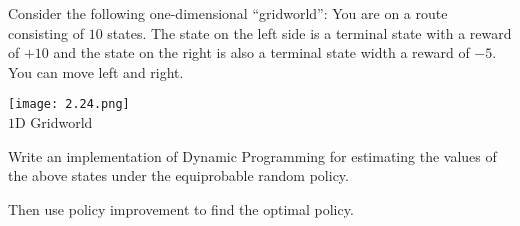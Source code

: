 
\begin{exercise}

Consider the following one-dimensional \enquote{gridworld}:
You are on a route consisting of $10$ states.
The state on the left side is a terminal state with a reward of $+10$ and the state on the right is also a terminal state width a reward of $-5$.
You can move left and right.

\begin{center}
    \texttt{[image: 2.24.png]} \\
    $1$D Gridworld
\end{center}

Write an implementation of Dynamic Programming for estimating the values of the above states under the equiprobable random policy.

Then use policy improvement to find the optimal policy.

\end{exercise}


\begin{solution}

\phantom{}

\end{solution}


